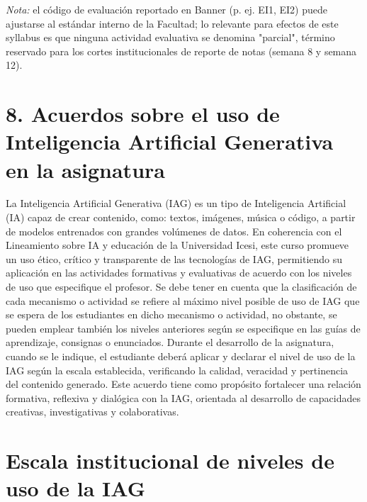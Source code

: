 \documentclass[11pt,a4paper]{article}
\begin{document}
\vspace{-0.3cm}
\noindent\textit{Nota:} el código de evaluación reportado en Banner (p. ej. EI1, EI2) puede ajustarse al estándar interno de la Facultad; lo relevante para efectos de este syllabus es que ninguna actividad evaluativa se denomina "parcial", término reservado para los cortes institucionales de reporte de notas (semana 8 y semana 12).

\section*{8. Acuerdos sobre el uso de Inteligencia Artificial Generativa en la asignatura}

La Inteligencia Artificial Generativa (IAG) es un tipo de Inteligencia Artificial (IA) capaz de crear contenido, como: textos, imágenes, música o código, a partir de modelos entrenados con grandes volúmenes de datos. En coherencia con el Lineamiento sobre IA y educación de la Universidad Icesi, este curso promueve un uso ético, crítico y transparente de las tecnologías de IAG, permitiendo su aplicación en las actividades formativas y evaluativas de acuerdo con los niveles de uso que especifique el profesor. Se debe tener en cuenta que la clasificación de cada mecanismo o actividad se refiere al máximo nivel posible de uso de IAG que se espera de los estudiantes en dicho mecanismo o actividad, no obstante, se pueden emplear también los niveles anteriores según se especifique en las guías de aprendizaje, consignas o enunciados. Durante el desarrollo de la asignatura, cuando se le indique, el estudiante deberá aplicar y declarar el nivel de uso de la IAG según la escala establecida, verificando la calidad, veracidad y pertinencia del contenido generado. Este acuerdo tiene como propósito fortalecer una relación formativa, reflexiva y dialógica con la IAG, orientada al desarrollo de capacidades creativas, investigativas y colaborativas.

\vspace{0.3cm}

\section*{Escala institucional de niveles de uso de la IAG}
\end{document}
